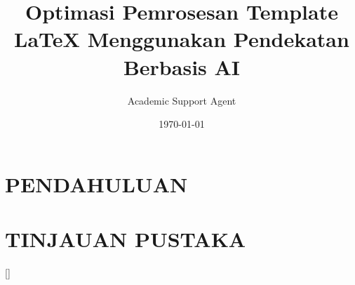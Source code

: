\documentclass{article}
\title{Optimasi Pemrosesan Template LaTeX Menggunakan Pendekatan Berbasis AI}
\author{Academic Support Agent}
\date{\today}
\begin{document}
\maketitle

\begin{abstract}

\end{abstract}

\chapter{PENDAHULUAN}


\chapter{TINJAUAN PUSTAKA}



\usepackage{latexsym}
\usepackage[empty]{fullpage}
\usepackage{titlesec}
\usepackage{marvosym}
\usepackage[usenames,dvipsnames]{color}
\usepackage{verbatim}
\usepackage{enumitem}
\usepackage[hidelinks]{hyperref}
\usepackage{fancyhdr}
\usepackage[english]{babel}
\usepackage{tabularx}


\usepackage[sfdefault]{roboto}  %

\pagestyle{fancy}
\fancyhf{}
\fancyfoot{}
\renewcommand{\headrulewidth}{0pt}
\renewcommand{\footrulewidth}{0pt}

\addtolength{\oddsidemargin}{-0.5in}
\addtolength{\evensidemargin}{-0.5in}
\addtolength{\textwidth}{1in}
\addtolength{\topmargin}{-.5in}
\addtolength{\textheight}{1.0in}

\raggedbottom
\raggedright
\setlength{\tabcolsep}{0in}

\titleformat{\section}{\Large\bfseries\scshape\raggedright}{}{0em}{}[\titlerule]


\newcommand{\resumeItem}[1]{\item\small{#1}}
\newcommand{\resumeSubheading}[4]{
\vspace{-1pt}\item
  \begin{tabular*}{0.97\textwidth}[t]{l@{\extracolsep{\fill}}r}
    \textbf{#1} & #2 \\
    \textit{#3} & \textit{#4} \\
  \end{tabular*}\vspace{-7pt}
}
\renewcommand\labelitemii{$\vcenter{\hbox{\tiny$\bullet$}}$}
\newcommand{\resumeSubHeadingList}{\begin{itemize}[leftmargin=0.15in, label={}]}
\newcommand{\resumeSubHeadingListEnd}{\end{itemize}}
\end{document}
